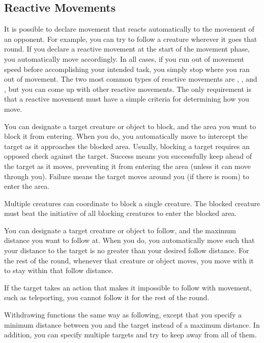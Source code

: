     \subsection{Reactive Movements}

        It is possible to declare movement that reacts automatically to the movement of an opponent.
        For example, you can try to follow a creature wherever it goes that round.
        If you declare a reactive movement at the start of the movement phase, you automatically move accordingly.
        In all cases, if you run out of movement speed before accomplishing your intended task, you simply stop where you ran out of movement.
        The two most common types of reactive movements are , , and , but you can come up with other reactive movements.
        The only requirement is that a reactive movement must have a simple criteria for determining how you move.

        \label{Blocking} You can designate a target creature or object to block, and the area you want to block it from entering.
        When you do, you automatically move to intercept the target as it approaches the blocked area.
        Usually, blocking a target requires an opposed  check against the target.
        Success means you successfully keep ahead of the target as it moves, preventing it from entering the area (unless it can move through you).
        Failure means the target moves around you (if there is room) to enter the area.

        Multiple creatures can coordinate to block a single creature.
        The blocked creature must beat the initiative of all blocking creatures to enter the blocked area.

        \label{Following} You can designate a target creature or object to follow, and the maximum distance you want to follow at. When you do, you automatically move such that your distance to the target is no greater than your desired follow distance. For the rest of the round, whenever that creature or object moves, you move with it to stay within that follow distance.

        If the target takes an action that makes it impossible to follow with movement, such as teleporting, you cannot follow it for the rest of the round.

        \label{Withdrawing} Withdrawing functions the same way as following, except that you specify a minimum distance between you and the target instead of a maximum distance.
        In addition, you can specify multiple targets and try to keep away from all of them.

